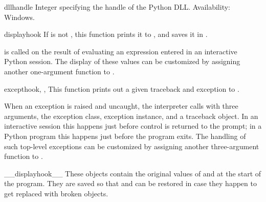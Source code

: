 \begin{datadesc}{dllhandle}
  Integer specifying the handle of the Python DLL.
  Availability: Windows.
\end{datadesc}

\begin{funcdesc}{displayhook}{}
  If  is not , this function prints it to
  , and saves it in .

   is called on the result of evaluating an
  expression entered in an interactive Python session.  The display of
  these values can be customized by assigning another one-argument
  function to .
\end{funcdesc}

\begin{funcdesc}{excepthook}{, , }
  This function prints out a given traceback and exception to
  .

  When an exception is raised and uncaught, the interpreter calls
   with three arguments, the exception class,
  exception instance, and a traceback object.  In an interactive
  session this happens just before control is returned to the prompt;
  in a Python program this happens just before the program exits.  The
  handling of such top-level exceptions can be customized by assigning
  another three-argument function to .
\end{funcdesc}

\begin{datadesc}{__displayhook__}
  These objects contain the original values of  and
   at the start of the program.  They are saved so
  that  and  can be restored in
  case they happen to get replaced with broken objects.
\end{datadesc}

